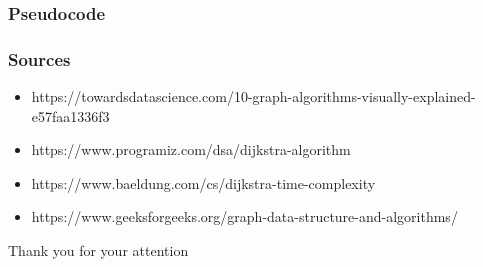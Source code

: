 \documentclass[pdf,fyma2]{beamer}
\begin{document}
\begin{frame}
    \frametitle{Pseudocode}
    
    \begin{center}
    \end{center}
\end{frame}

\begin{frame}
    \frametitle{Sources}
    \begin{itemize}
        \item https://towardsdatascience.com/10-graph-algorithms-visually-explained-e57faa1336f3
        \item https://www.programiz.com/dsa/dijkstra-algorithm
        \item https://www.baeldung.com/cs/dijkstra-time-complexity
        \item https://www.geeksforgeeks.org/graph-data-structure-and-algorithms/
    \end{itemize}
\end{frame}

\begin{frame}
    \textcolor{myNewColorA}{\Huge{\centerline{Thank you for your attention}}}
\end{frame}

\appendix
\end{document}
